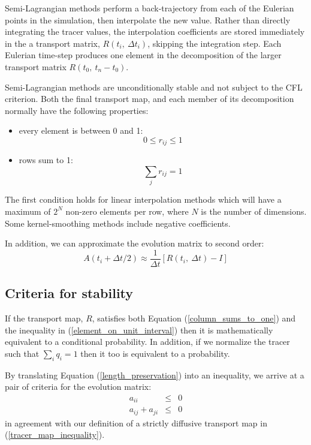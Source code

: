 \documentclass[11pt]{article}
\begin{document}
Semi-Lagrangian methods perform a back-trajectory from each of the Eulerian
points in the simulation, then interpolate the new value.  Rather than
directly integrating the tracer values, 
the interpolation coefficients are stored immediately
in the a transport matrix, $R(t_i,~\Delta t_i)$, skipping the integration
step.
Each Eulerian time-step produces one element in the decomposition of the
larger transport matrix $R(t_0,~t_n-t_0)$.

Semi-Lagrangian methods are unconditionally stable and not subject to the
CFL criterion.
Both the final transport map, and each member of its decomposition normally have
the following properties:
\begin{itemize}
\item every element is between 0 and 1:
\begin{equation}
0 \le r_{ij} \le 1
\label{element_on_unit_interval}
\end{equation}
\item rows sum to 1:
\begin{equation}
\sum_j r_{ij} = 1
\end{equation}
\end{itemize}
The first condition holds for linear interpolation methods which will have
a maximum of $2^N$ non-zero elements per row, 
where $N$ is the number of dimensions. 
Some kernel-smoothing methods include negative coefficients.

In addition, we can approximate the evolution matrix to second order:
\begin{equation}
A(t_i+\Delta t/2) \approx \frac{1}{\Delta t} \left [R(t_i,~\Delta t) - I \right ]
\end{equation}

\subsection{Criteria for stability}

If the transport map, $R$, satisfies both Equation (\ref{column_sums_to_one})
and the inequality in (\ref{element_on_unit_interval}) then it is mathematically
equivalent to a conditional probability.
In addition, if we normalize the tracer such that $\sum_i q_i=1$
then it too is equivalent to a probability.

By translating Equation (\ref{length_preservation}) into an inequality, 
we arrive at a pair of criteria for the evolution matrix:
\begin{eqnarray}
a_{ii} & \le & 0 \\
a_{ij}+a_{ji} & \le & 0
\end{eqnarray}
in agreement with our definition of a strictly diffusive transport map in
(\ref{tracer_map_inequality}).
\end{document}
